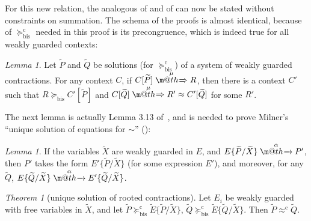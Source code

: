 \documentclass[GCNS]{yincog}
\makeatletter
\def \rightarrowfill{$\m@th\mathord{\smash-}\mkern-6mu%
  \cleaders\hbox{$\mkern-2mu\mathord{\smash-}\mkern-2mu$}\hfill
  \mkern-6mu\mathord\rightarrow$}
\def \rightarrowfillWEAK{$\m@th\mathord{\smash=}\mkern-6mu%
  \cleaders\hbox{$\mkern-2mu\mathord{\smash=}\mkern-2mu$}\hfill
  \mkern-6mu\mathord\Rightarrow$}
\theoremstyle{remark}
\theoremstyle{theorem}
\newtheorem{lemma}[definition]{Lemma}
\newtheorem{theorem}[definition]{Theorem}
\theoremstyle{remark}
\newcommand{\arr}[1]{\mathrel{\stackrel{{\;\;#1\;\;}}{\mbox{\rightarrowfill}}}}
\newcommand{\Arr}[1]{\mathrel{\stackrel{{\;\;#1\;\;}}{\mbox{\rightarrowfillWEAK}}}}
\newcommand{\ctvtex}[1]{ C \brac{#1} }
\newcommand{\qct}{ C }
\newcommand{\brac}[1]{[#1] }
\renewcommand{\tilde}{\widetilde}
\newcommand{\rapprox}{\mathrel{\approx^{\mathrm{c}}}}
\newcommand{\wbvtex}{\approx}
\newcommand{\mcontrBIS}{\mathrel{\succeq_{\mathrm{bis}}}}
\newcommand{\rcontr}{\mathrel{\succeq^{\mathrm{c}}_{\mathrm{bis}}}}
\newcommand{\til}{\tilde}
\newcommand{\ctp}[1]{ C' \brac{#1} }
\newcommand{\qctp}{ C' }
\makeatother
\begin{document}
For this new relation, the analogous of  and of 
can now be stated without constraints on summation. The schema of the proofs
is almost identical, because  of $\rcontr $ needed in this
proof is its precongruence, which is indeed true for all weakly guarded
contexts:
%
\begin{lemma}
 \label{l:ruptocon}
Let $\til P$ and $\til Q$ be solutions (for $\rcontr $) of a system of
weakly guarded contractions. For any context $\qct $, if
$\ctvtex{\til P}\Arr{\mu} R$, then there is a context $\qctp $ such that
$R \mcontrBIS \ctp{\til P}$ and
$\ctvtex{\til Q} \Arr{\mu} R' \wbvtex \ctp{\til Q}$ for some $R'$.
\end{lemma}

The next lemma is actually Lemma 3.13 of~\citep[p.~102]{Mil89}, and is
needed to prove Milner's ``unique solution of equations for $\sim $'' ():
%
\begin{lemma}
 \label{lem:milner313}
If the variables ${\til X}$ are weakly guarded in $E$, and
$E\{\til P/\til X\} \arr{\alpha} P'$, then $P'$ takes the form
$E'\{\til P/\til X\}$ (for some expression $E'$), and moreover, for any
${\til Q}$, $E\{\til Q/\til X\} \arr{\alpha} E'\{\til Q/\til X\}$.
\end{lemma}

\begin{theorem}[unique solution of rooted contractions]
 \label{t:rcontraBisimulationU}
Let $E_i$ be weakly guarded with free variables in $\til X$, and let
$\til P \rcontr \til E\{\til P/\til X\}$,
$\til Q \rcontr \til E\{\til Q/\til X\}$. Then
$\til P \rapprox \til Q$.
\end{theorem}
\end{document}
